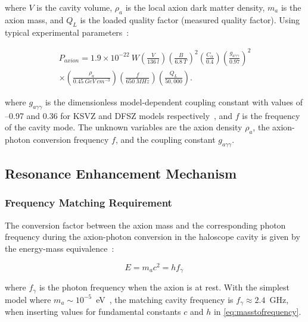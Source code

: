     \noindent where $V$ is the cavity volume, $\rho_a$ is the local axion dark matter density, $m_a$ is the axion mass, and $Q_L$ is the loaded quality factor (measured quality factor). Using typical experimental parameters~\cite{Braine:2024nzi}:

    \begin{equation}
    \begin{split}
        P_{axion} = 1.9 \times 10^{-22} \ \si{W} \left( \frac{V}{136\ \si{l}} \right) \left( \frac{B}{6.8\  \si{T}} \right)^2 \left( \frac{C_{\alpha}}{0.4} \right) \left( \frac{g_{a\gamma\gamma}}{ 0.97}\right)^2 \\ 
        \times \left( \frac{\rho_a}{ 0.45\ \si{GeV} \ \si{cm}^{-3}} \right) \left( \frac{f}{ 650\ \si{MHz}} \right) \left( \frac{Q_{L}}{ 50{,}000} \right).
        \label{eq:FullPower2}  
    \end{split}
    \end{equation}

    \noindent where $g_{a\gamma\gamma}$ is the dimensionless model-dependent coupling constant with values of --0.97 and 0.36 for KSVZ and DFSZ models respectively~\cite{ADMX:2018gho}, and $f$ is the frequency of the cavity mode. The unknown variables are the axion density $\rho_a$, the axion-photon conversion frequency $f$, and the coupling constant $g_{a\gamma\gamma}$.

    \subsection{Resonance Enhancement Mechanism}
    
    \subsubsection{Frequency Matching Requirement}

    The conversion factor between the axion mass and the corresponding photon frequency during the axion-photon conversion in the haloscope cavity is given by the energy-mass equivalence~\cite{alberteinsteinElectrodynmaicsMovingBodies1905, griffithsIntroductionElectrodynamics2023}:
    
    \begin{equation}
        E = m_ac^2 = hf_{\gamma} \,
        \label{eq:masstofrequency}
    \end{equation}
    
    \noindent where $f_{\gamma}$ is the photon frequency when the axion is at rest. With the simplest model where $m_a \sim 10^{-5}$~eV~\cite{Sikivie:2020zpn}, the matching cavity frequency is $f_{\gamma} \approx 2.4$~GHz, when inserting values for fundamental constants $c$ and $h$ in \ref{eq:masstofrequency}. 
    
